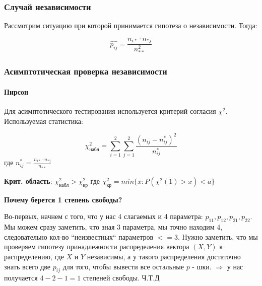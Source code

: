 \documentclass{article}
\begin{document}
    \subsubsection{Случай независимости}

    Рассмотрим ситуацию при которой принимается гипотеза о независимости. Тогда:

    \begin{equation}
        \widehat{p_{ij}} = \frac{n_{i*} \cdot n_{*j}}{n_{**}^2}
    \end{equation}


    \subsubsection{Асимптотическая проверка независимости}

    \paragraph{Пирсон}

    \quad

    Для асимптотического тестирования используется критерий согласия $\chi^2$. Используемая статистика:

    \begin{equation}
        \chi^2_{набл} = \sum_{i=1}^{2}{\sum_{j=1}^{2}{ \frac{( n_{ij} - n_{ij}^{*} )^{2}}{ n_{ij}^{*} } }}
    \end{equation}
    где $n_{ij}^{*} = \frac{n_{i*} \cdot n_{*j}}{n_{**}}$
    
    \textbf{Крит. область}: $\chi^2_{\text{набл}} > \chi^2_{\text{кр}}$ где $\chi^2_{\text{кр}} =
    min\{x: P(\chi^2(1) > x) < a  \}$

    \quad

    \textbf{Почему берется 1 степень свободы?}

    \quad

    Во-первых, начнем с того, что у нас 4 слагаемых и 4 параметра: $p_{11}, p_{12}, p_{21}, p_{22}$.
    Мы можем сразу заметить, что зная 3 параметра, мы точно находим 4, следовательно кол-во ``неизвестных`` параметров $<= 3$.
    Нужно заметить, что мы проверяем гипотезу принадлежности распределения вектора $(X, Y)$ к распределению, где $X$ и $Y$ независимы,
    а у такого распределения достаточно знать всего две $p_{ij}$ для того, чтобы вывести все остальные $p$ - шки.
    $\Rightarrow$ у нас получается $4 - 2 - 1 = 1$ степеней свободы. Ч.Т.Д

    \quad
\end{document}
